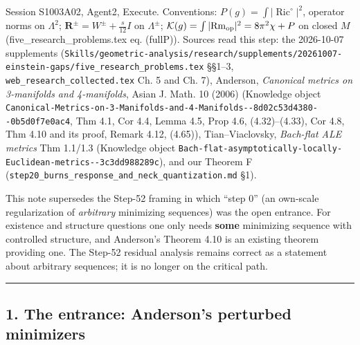 \documentclass[
  10pt,
]{report}
\begin{document}
Session S1003A02, Agent2, Execute. Conventions:
\(P(g)=\int|\operatorname{Ric}^\circ|^2\), operator norms on
\(\Lambda^2\); \(\mathbf R^\pm=W^\pm+\tfrac s{12}I\) on \(\Lambda^\pm\);
\(\mathcal K(g)=\int|\mathrm{Rm}_{\rm op}|^2=8\pi^2\chi+P\) on closed
\(M\) (five\_research\_problems.tex eq. (fullP)). Sources read this
step: the 2026-10-07 supplements
(\texttt{Skills/geometric-analysis/research/supplements/20261007-einstein-gaps/five\_research\_problems.tex}
§§1--3, \texttt{web\_research\_collected.tex} Ch. 5 and Ch. 7),
Anderson, \emph{Canonical metrics on 3-manifolds and 4-manifolds}, Asian
J. Math. 10 (2006) (Knowledge object
\texttt{Canonical-Metrics-on-3-Manifolds-and-4-Manifolds-\/-8d02c53d4380-\/-0b5d0f7e0ac4},
Thm 4.1, Cor 4.4, Lemma 4.5, Prop 4.6, (4.32)--(4.33), Cor 4.8, Thm 4.10
and its proof, Remark 4.12, (4.65)), Tian--Viaclovsky, \emph{Bach-flat
ALE metrics} Thm 1.1/1.3 (Knowledge object
\texttt{Bach-flat-asymptotically-locally-Euclidean-metrics-\/-3c3dd988289c}),
and our Theorem F
(\texttt{step20\_burns\_response\_and\_neck\_quantization.md} §1).

This note supersedes the Step-52 framing in which ``step 0'' (an
own-scale regularization of \emph{arbitrary} minimizing sequences) was
the open entrance. For existence and structure questions one only needs
\textbf{some} minimizing sequence with controlled structure, and
Anderson's Theorem 4.10 is an existing theorem providing one. The
Step-52 residual analysis remains correct as a statement about arbitrary
sequences; it is no longer on the critical path.

\begin{center}\rule{0.5\linewidth}{0.5pt}\end{center}

\hypertarget{the-entrance-andersons-perturbed-minimizers}{%
\subsection{1. The entrance: Anderson's perturbed
minimizers}\label{the-entrance-andersons-perturbed-minimizers}}
\end{document}
